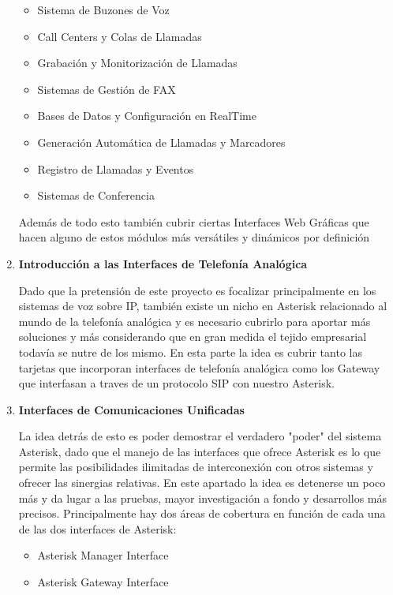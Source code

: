 \begin{enumerate}
\begin{itemize}
	  \setlength{\itemsep}{10pt}
	
		\item Sistema de Buzones de Voz
		\item Call Centers y Colas de Llamadas
		\item Grabación y Monitorización de Llamadas
		\item Sistemas de Gestión de FAX
		\item Bases de Datos y Configuración en RealTime
		\item Generación Automática de Llamadas y Marcadores
		\item Registro de Llamadas y Eventos
		\item Sistemas de Conferencia
		
	\end{itemize}
	
	Además de todo esto también cubrir ciertas Interfaces Web Gráficas que hacen alguno de estos módulos más versátiles y dinámicos por definición
	
	\item \textbf{Introducción a las Interfaces de Telefonía Analógica} 
	
	Dado que la pretensión de este proyecto es focalizar principalmente en los sistemas de voz sobre IP, también existe un nicho en Asterisk relacionado al mundo de la telefonía analógica y es necesario cubrirlo para aportar más soluciones y más considerando que en gran medida el tejido empresarial todavía se nutre de los mismo. En esta parte la idea es cubrir tanto las tarjetas que incorporan interfaces de telefonía analógica como los Gateway que interfasan a traves de un protocolo SIP con nuestro Asterisk.
	
	\item \textbf{Interfaces de Comunicaciones Unificadas} 
	
	La idea detrás de esto es poder demostrar el verdadero "poder" del sistema Asterisk, dado que el manejo de las interfaces que ofrece Asterisk es lo que permite las posibilidades ilimitadas de interconexión con otros sistemas y ofrecer las sinergias relativas. En este apartado la idea es detenerse un poco más y da lugar a las pruebas, mayor investigación a fondo y desarrollos más precisos. Principalmente hay dos áreas de cobertura en función de cada una de las dos interfaces de Asterisk:\\
	
	\begin{itemize}
	  \setlength{\itemsep}{10pt}
		\item Asterisk Manager Interface
		\item Asterisk Gateway Interface 
	\end{itemize}


\end{enumerate}
